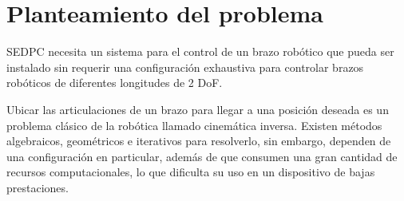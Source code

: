\section{Planteamiento del problema}

SEDPC necesita un sistema para el control de un brazo robótico que pueda ser instalado sin requerir una configuración exhaustiva para controlar brazos robóticos de diferentes longitudes de 2 DoF.

\newline\newline\newline
Ubicar las articulaciones de un brazo para llegar a una posición deseada es un problema clásico de la robótica llamado cinemática inversa. Existen métodos algebraicos, geométricos e iterativos para resolverlo, sin embargo, dependen de una configuración en particular, además de que consumen una gran cantidad de recursos computacionales, lo que dificulta su uso en un dispositivo de bajas prestaciones.